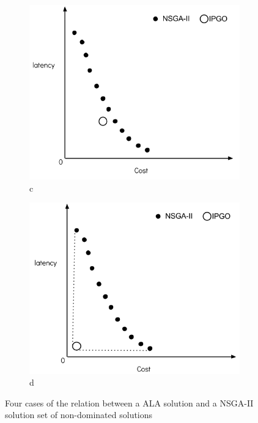 \documentclass{llncs}
\begin{document}
\begin{figure}[H]
	\begin{subfigure}[b]{0.4\textwidth}
		\includegraphics[width=\textwidth]{pics/3.png}
		\caption{c}
	\end{subfigure}
	\begin{subfigure}[b]{0.4\textwidth}
		\includegraphics[width=\textwidth]{pics/4.png}
		\caption{d}
	\end{subfigure}
	\caption{Four cases of the relation between a ALA solution and a NSGA-II solution set of non-dominated solutions}
\label{fig:Pareto}
\end{figure}
\end{document}
